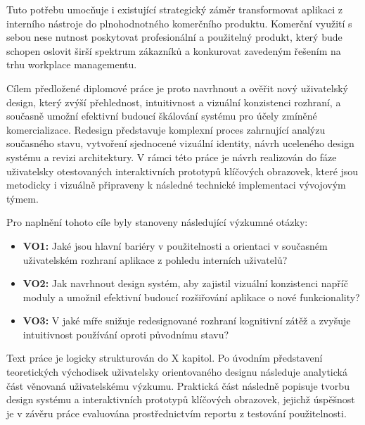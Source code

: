 Tuto potřebu umocňuje i existující strategický záměr transformovat aplikaci z interního nástroje do plnohodnotného komerčního produktu. Komerční využití s sebou nese nutnost poskytovat profesionální a použitelný produkt, který bude schopen oslovit širší spektrum zákazníků a konkurovat zavedeným řešením na trhu workplace managementu.

Cílem předložené diplomové práce je proto navrhnout a ověřit nový uživatelský design, který zvýší přehlednost, intuitivnost a vizuální konzistenci rozhraní, a současně umožní efektivní budoucí škálování systému pro účely zmíněné komercializace. Redesign představuje komplexní proces zahrnující analýzu současného stavu, vytvoření sjednocené vizuální identity, návrh uceleného design systému a revizi architektury. V rámci této práce je návrh realizován do fáze uživatelsky otestovaných interaktivních prototypů klíčových obrazovek, které jsou metodicky i vizuálně připraveny k následné technické implementaci vývojovým týmem.

Pro naplnění tohoto cíle byly stanoveny následující výzkumné otázky:

\begin{itemize}
    \item \textbf{VO1:} Jaké jsou hlavní bariéry v použitelnosti a orientaci v současném uživatelském rozhraní aplikace z pohledu interních uživatelů?
    \item \textbf{VO2:} Jak navrhnout design systém, aby zajistil vizuální konzistenci napříč moduly a umožnil efektivní budoucí rozšiřování aplikace o nové funkcionality?
    \item \textbf{VO3:} V jaké míře snižuje redesignované rozhraní kognitivní zátěž a zvyšuje intuitivnost používání oproti původnímu stavu?
\end{itemize}

Text práce je logicky strukturován do X kapitol. Po úvodním představení teoretických východisek uživatelsky orientovaného designu následuje analytická část věnovaná uživatelskému výzkumu. Praktická část následně popisuje tvorbu design systému a interaktivních prototypů klíčových obrazovek, jejichž úspěšnost je v závěru práce evaluována prostřednictvím reportu z testování použitelnosti.